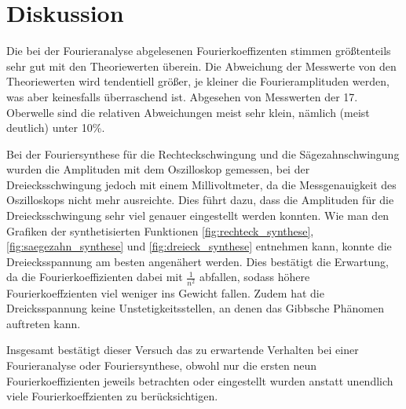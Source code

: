 \section{Diskussion}
\label{sec:Diskussion}
Die bei der Fourieranalyse abgelesenen Fourierkoeffizenten stimmen größtenteils
sehr gut mit den Theoriewerten überein. Die Abweichung der Messwerte von den
Theoriewerten wird tendentiell größer, je kleiner die Fourieramplituden werden,
was aber keinesfalls überraschend ist. Abgesehen von Messwerten der 17. Oberwelle
sind die relativen Abweichungen meist sehr klein, nämlich (meist deutlich) unter
10\%.

Bei der Fouriersynthese für die Rechteckschwingung und die Sägezahnschwingung
wurden die Amplituden mit dem Oszilloskop gemessen, bei der Dreiecksschwingung
jedoch mit einem Millivoltmeter, da die Messgenauigkeit des Oszilloskops nicht
mehr ausreichte. Dies führt dazu, dass die Amplituden für die Dreiecksschwingung
sehr viel genauer eingestellt werden konnten.\newline
Wie man den Grafiken der synthetisierten Funktionen \ref{fig:rechteck_synthese},
\ref{fig:saegezahn_synthese} und \ref{fig:dreieck_synthese} entnehmen kann, konnte
die Dreiecksspannung am besten angenähert werden. Dies bestätigt die Erwartung,
da die Fourierkoeffizienten dabei mit $\frac{1}{n^2}$ abfallen, sodass höhere
Fourierkoeffzienten viel weniger ins Gewicht fallen. Zudem hat die Dreicksspannung
keine Unstetigkeitsstellen, an denen das Gibbsche Phänomen auftreten kann.

Insgesamt bestätigt dieser Versuch das zu erwartende Verhalten bei einer
Fourieranalyse oder Fouriersynthese, obwohl nur die ersten neun Fourierkoeffizienten
jeweils betrachten oder eingestellt wurden anstatt unendlich viele Fourierkoeffzienten
zu berücksichtigen.
